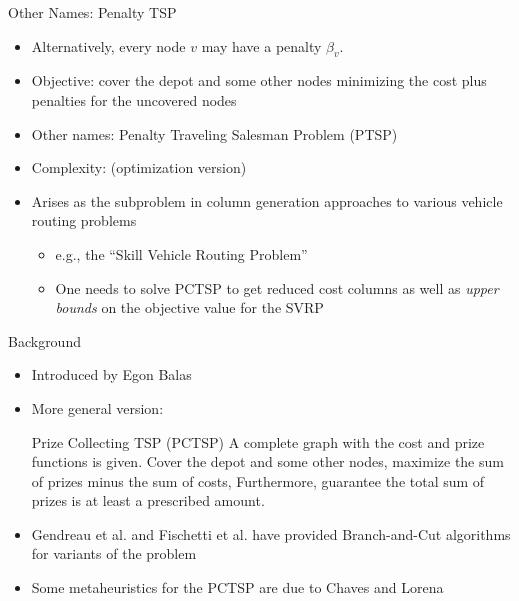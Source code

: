 \documentclass[10pt]{beamer}
\begin{document}
\begin{frame}[fragile]{Other Names: Penalty TSP}
\begin{itemize}
\item<1-> Alternatively, every node $v$ may have a penalty $\beta_v$. 
\item<2-> Objective: cover the depot and some other nodes minimizing the cost plus penalties for the uncovered nodes
\item<3-> Other names: Penalty Traveling Salesman Problem (PTSP)
\item<4-> Complexity: \NPH (optimization version)
\item<5-> Arises as the subproblem in column generation approaches to various vehicle routing problems
	\begin{itemize}
	\item<6-> e.g., the ``Skill Vehicle Routing Problem'' 	\cite{Cappanera2011}
	\item<7-> One needs to solve PCTSP to get reduced cost columns as well as \emph{upper bounds} on the objective value for the SVRP
    \end{itemize}
\end{itemize}
\end{frame}

\begin{frame}[fragile]{Background}
\begin{itemize}
    \item<1-> Introduced by Egon Balas \cite{Balas89}
    \item<2-> More general version:
	\begin{alertblock}{Prize Collecting TSP (PCTSP)}
		A complete graph with the cost and prize functions is given. Cover the depot and some other nodes, maximize the sum of prizes minus the sum of costs, Furthermore, guarantee the total sum of prizes is at least a \alert{prescribed} amount.
	\end{alertblock}
	\item<3-> Gendreau et al. \cite{GLS98} and Fischetti et al. \cite{FST97} have provided Branch-and-Cut algorithms for variants of the problem
    \item<4-> Some metaheuristics for the PCTSP are due to Chaves and Lorena \cite{Chaves08}
\end{itemize}
\end{frame}
\end{document}
